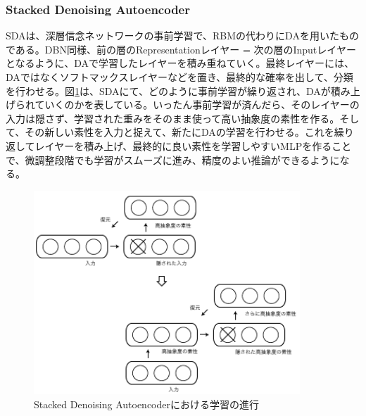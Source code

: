 \subsubsection{Stacked Denoising Autoencoder}
SDAは、深層信念ネットワークの事前学習で、RBMの代わりにDAを用いたものである。DBN同様、前の層のRepresentationレイヤー = 次の層のInputレイヤーとなるように、DAで学習したレイヤーを積み重ねていく。最終レイヤーには、DAではなくソフトマックスレイヤーなどを置き、最終的な確率を出して、分類を行わせる。図\ref{c3_sda}は、SDAにて、どのように事前学習が繰り返され、DAが積み上げられていくのかを表している。いったん事前学習が済んだら、そのレイヤーの入力は隠さず、学習された重みをそのまま使って高い抽象度の素性を作る。そして、その新しい素性を入力と捉えて、新たにDAの学習を行わせる。これを繰り返してレイヤーを積み上げ、最終的に良い素性を学習しやすいMLPを作ることで、微調整段階でも学習がスムーズに進み、精度のよい推論ができるようになる。
\begin{figure}[tbp]
 \centering
  \includegraphics[width=100mm]{img/c3/sda}
 \caption{Stacked Denoising Autoencoderにおける学習の進行}
 \label{c3_sda}
\end{figure}


